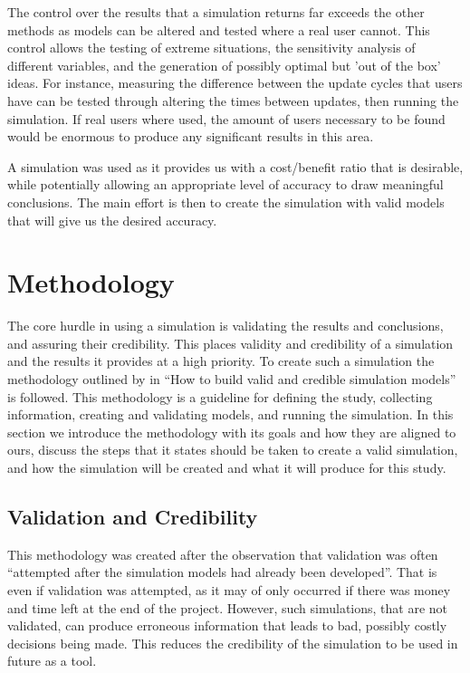 The control over the results that a simulation returns far exceeds the other methods as models can be altered and tested where a real user cannot. 
This control allows the testing of extreme situations, the sensitivity analysis of different variables,
and the generation of possibly optimal but 'out of the box' ideas. 
For instance, measuring the difference between the update cycles that users have can be tested through altering the times between updates, then running the simulation.
If real users where used, the amount of users necessary to be found would be enormous to produce any significant results in this area.

A simulation was used as it provides us with a cost/benefit ratio that is desirable, while potentially allowing an appropriate level of accuracy to draw meaningful conclusions.
The main effort is then to create the simulation with valid models that will give us the desired accuracy.

\section{Methodology}
{}The core hurdle in using a simulation is validating the results and conclusions, and assuring their credibility.
{}This places validity and credibility of a simulation and the results it provides at a high priority.
{}To create such a simulation the methodology outlined by \cite{Law2005} in ``How to build valid and credible simulation models'' is followed.
{}This methodology is a guideline for defining the study, collecting information, creating and validating models, and running the simulation.
{}In this section we introduce the methodology with its goals and how they are aligned to ours, 
{}discuss the steps that it states should be taken to create a valid simulation, and how the simulation will be created and what it will produce for this study.

\subsection{Validation and Credibility}
This methodology was created after the observation that validation was often ``attempted after the simulation models had already been developed''.
That is even if validation was attempted, as it may of only occurred if there was money and time left at the end of the project.
However, such simulations, that are not validated, can produce erroneous information that leads to bad, possibly costly decisions being made.
This reduces the credibility of the simulation to be used in future as a tool.

